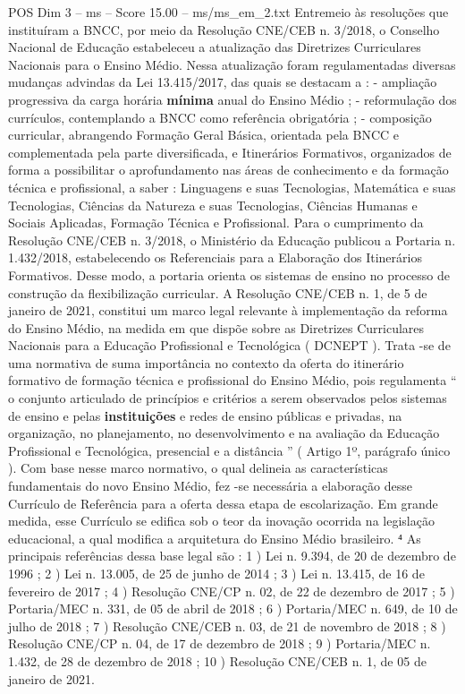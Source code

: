 \begin{textsample}{POS Dim 3 – ms – Score 15.00 – ms/ms\_em\_2.txt}
Entremeio às resoluções que instituíram a BNCC, por meio da Resolução CNE/CEB n. 3/2018, o Conselho Nacional de Educação estabeleceu a atualização das Diretrizes Curriculares Nacionais para o Ensino Médio.
Nessa atualização foram regulamentadas diversas mudanças advindas da Lei 13.415/2017, das quais se destacam a : - ampliação progressiva da carga horária \textbf{mínima} anual do Ensino Médio ; - reformulação dos currículos, contemplando a BNCC como referência obrigatória ; - composição curricular, abrangendo Formação Geral Básica, orientada pela BNCC e complementada pela parte diversificada, e Itinerários Formativos, organizados de forma a possibilitar o aprofundamento nas áreas de conhecimento e da formação técnica e profissional, a saber : Linguagens e suas Tecnologias, Matemática e suas Tecnologias, Ciências da Natureza e suas Tecnologias, Ciências Humanas e Sociais Aplicadas, Formação Técnica e Profissional.
Para o cumprimento da Resolução CNE/CEB n. 3/2018, o Ministério da Educação publicou a Portaria n. 1.432/2018, estabelecendo os Referenciais para a Elaboração dos Itinerários Formativos.
Desse modo, a portaria orienta os sistemas de ensino no processo de construção da flexibilização curricular.
A Resolução CNE/CEB n. 1, de 5 de janeiro de 2021, constitui um marco legal relevante à implementação da reforma do Ensino Médio, na medida em que dispõe sobre as Diretrizes Curriculares Nacionais para a Educação Profissional e Tecnológica ( DCNEPT ).
Trata -se de uma normativa de suma importância no contexto da oferta do itinerário formativo de formação técnica e profissional do Ensino Médio, pois regulamenta “ o conjunto articulado de princípios e critérios a serem observados pelos sistemas de ensino e pelas \textbf{instituições} e redes de ensino públicas e privadas, na organização, no planejamento, no desenvolvimento e na avaliação da Educação Profissional e Tecnológica, presencial e a distância ” ( Artigo 1º, parágrafo único ).
Com base nesse marco normativo, o qual delineia as características fundamentais do novo Ensino Médio, fez -se necessária a elaboração desse Currículo de Referência para a oferta dessa etapa de escolarização.
Em grande medida, esse Currículo se edifica sob o teor da inovação ocorrida na legislação educacional, a qual modifica a arquitetura do Ensino Médio brasileiro. ⁴ As principais referências dessa base legal são : 1 ) Lei n. 9.394, de 20 de dezembro de 1996 ; 2 ) Lei n. 13.005, de 25 de junho de 2014 ; 3 ) Lei n. 13.415, de 16 de fevereiro de 2017 ; 4 ) Resolução CNE/CP n. 02, de 22 de dezembro de 2017 ; 5 ) Portaria/MEC n. 331, de 05 de abril de 2018 ; 6 ) Portaria/MEC n. 649, de 10 de julho de 2018 ; 7 ) Resolução CNE/CEB n. 03, de 21 de novembro de 2018 ; 8 ) Resolução CNE/CP n. 04, de 17 de dezembro de 2018 ; 9 ) Portaria/MEC n. 1.432, de 28 de dezembro de 2018 ; 10 ) Resolução CNE/CEB n. 1, de 05 de janeiro de 2021.

\end{textsample}
